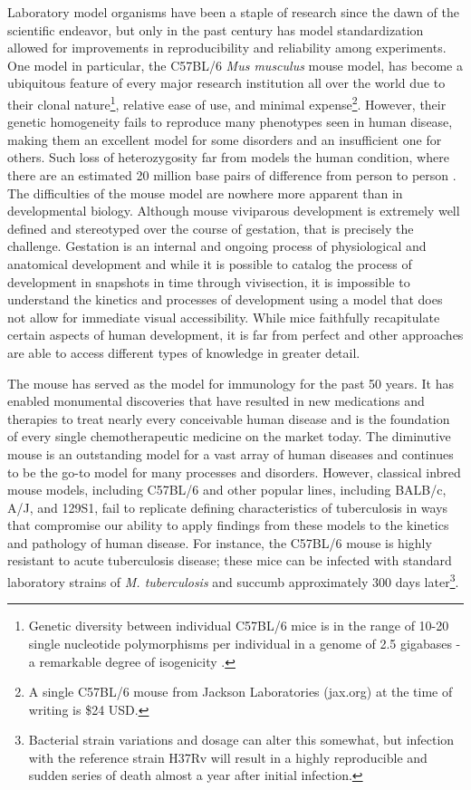 Laboratory model organisms have been a staple of research since the dawn of the scientific endeavor, but only in the past century has model standardization allowed for improvements in reproducibility and reliability among experiments. One model in particular, the C57BL/6 \textit{Mus musculus} mouse model, has become a ubiquitous feature of every major research institution all over the world due to their clonal nature\footnote{Genetic diversity between individual C57BL/6 mice is in the range of 10-20 single nucleotide polymorphisms per individual in a genome of 2.5 gigabases - a remarkable degree of isogenicity \citep{Bryant2011, Sarsani2019}.}, relative ease of use, and minimal expense\footnote{A single C57BL/6 mouse from Jackson Laboratories (jax.org) at the time of writing is \$24 USD.}. However, their genetic homogeneity fails to reproduce many phenotypes seen in human disease, making them an excellent model for some disorders and an insufficient one for others. Such loss of heterozygosity far from models the human condition, where there are an estimated 20 million base pairs of difference from person to person \citep{Genomes2015}. The difficulties of the mouse model are nowhere more apparent than in developmental biology. Although mouse viviparous development is extremely well defined and stereotyped over the course of gestation, that is precisely the challenge. Gestation is an internal and ongoing process of physiological and anatomical development and while it is possible to catalog the process of development in snapshots in time through vivisection, it is impossible to understand the kinetics and processes of development using a model that does not allow for immediate visual accessibility. While mice faithfully recapitulate certain aspects of human development, it is far from perfect and other approaches are able to access different types of knowledge in greater detail.

The mouse has served as the model for immunology for the past 50 years. It has enabled monumental discoveries that have resulted in new medications and therapies to treat nearly every conceivable human disease and is the foundation of every single chemotherapeutic medicine on the market today. The diminutive mouse is an outstanding model for a vast array of human diseases and continues to be the go-to model for many processes and disorders. However, classical inbred mouse models, including C57BL/6 and other popular lines, including BALB/c, A/J, and 129S1, fail to replicate defining characteristics of tuberculosis in ways that compromise our ability to apply findings from these models to the kinetics and pathology of human disease. For instance, the C57BL/6 mouse is highly resistant to acute tuberculosis disease; these mice can be infected with standard laboratory strains of \textit{M. tuberculosis} and succumb approximately 300 days later\footnote{Bacterial strain variations and dosage can alter this somewhat, but infection with the reference strain H37Rv will result in a highly reproducible and sudden series of death almost a year after initial infection.}. 

